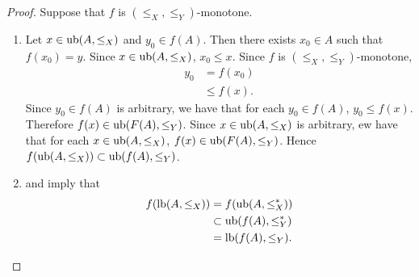 \documentclass{book}
\begin{document}
	\begin{proof}
		Suppose that $f$ is $(\leq_X, \leq_Y)$-monotone. 
		\begin{enumerate}
			\item Let $x \in \operatorname{ub} (A, \leq_X)$ and $y_0 \in f(A)$. Then there exists $x_0 \in A$ such that $f(x_0) = y$. Since $x \in \operatorname{ub} (A, \leq_X)$, $x_0 \leq x$. Since $f$ is $(\leq_X, \leq_Y)$-monotone,  
			\begin{align*}
				y_0
				& = f(x_0) \\
				& \leq f(x).
			\end{align*}
			Since $y_0 \in f(A)$ is arbitrary, we have that for each $y_0 \in f(A)$, $y_0 \leq f(x)$. Therefore $f(x) \in \operatorname{ub}(F(A), \leq_Y)$. Since $x \in \operatorname{ub} (A, \leq_X)$ is arbitrary, ew have that for each $x \in \operatorname{ub} (A, \leq_X)$, $f(x) \in \operatorname{ub}(F(A), \leq_Y)$. Hence $f(\operatorname{ub} (A, \leq_X)) \subset \operatorname{ub}(f(A), \leq_Y)$.
			\item {} and  imply that 
			\begin{align*}
				f(\operatorname{lb} (A, \leq_X)) 
				& = f(\operatorname{ub} (A, \leq^*_X)) \\
				& \subset \operatorname{ub}(f(A), \leq^*_Y) \\
				& = \operatorname{lb}(f(A), \leq_Y).
			\end{align*}
		\end{enumerate}
	\end{proof}
	
	
	
	
	
	
	
	
	
	
	
	
	
	
	
	
	
	
	
	
	
	
	
	
	
	
	
	
	
	
	
	
	
	
	
	
	
	
	
	
	
	
	
	
	
	
	
	
	
	
	
\end{document}
